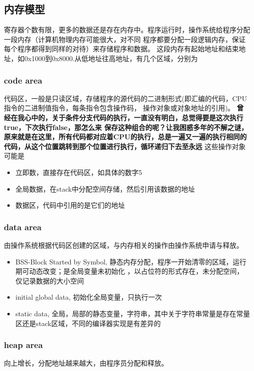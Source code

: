 \subsection{内存模型}
寄存器个数有限，更多的数据还是存在内存中。程序运行时，操作系统给程序分配一段内存（计算机物理内存可能很大，对不同
程序都要分配一段逻辑内存，保证每个程序都得到同样的对待）来存储程序和数据。
\newline
这段内存有起始地址和结束地址，如0x1000到0x8000.从低地址往高地址，有几个区域，分别为
\subsubsection{code area}
代码区，一般是只读区域，存储程序的源代码的二进制形式(即汇编的代码，CPU指令的二进制值指令，每条指令包含操作码，
操作对象或对象地址的引用)。
\newline
\textbf{曾经在我心中的，关于条件分支代码的执行，一直没有明白，总觉得要是这次执行true，下次执行false，那怎么来
保存这种组合的呢？让我困惑多年的不解之谜，原来就是在这里，所有代码都对应着CPU的执行，总是一遍又一遍的执行相同的
代码，从这个位置跳转到那个位置进行执行，循环递归下去至永远}
\newline
这些操作对象可能是
\begin{itemize}
    \item {立即数，直接存在代码区，如具体的数字5}
    \item {全局数据，在stack中分配空间存储，然后引用该数据的地址}
    \item {数据区，代码中引用的是它们的地址}
\end{itemize}

\subsubsection{data area}
由操作系统根据代码区创建的区域，与内存相关的操作由操作系统申请与释放。
\begin{itemize}
    \item {BSS-Block Started by Symbol, 静态内存分配，程序一开始清零的区域，运行期可动态改变；是全局变量未初始化
    ，以占位符的形式存在，未分配空间，仅记录数据的大小空间
    }
    \item {initial global data, 初始化全局变量，只执行一次}
    \item {static data, 全局，局部的静态变量，字符串，其中关于字符串常量是存在常量区还是stack区域，不同的编译器实现是有差异的}
\end{itemize}

\subsubsection{heap area}
向上增长，分配地址越来越大，由程序员分配和释放。

